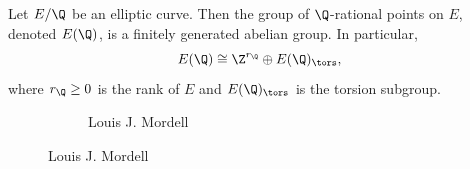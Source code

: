 

{
\begin{frame}
\titlepage
\end{frame}
}



\begin{frame}
	\begin{thm}[Mordell, 1922]
	Let $E/\Q$ be an elliptic curve. Then the group of $\Q$-rational points on $E$, denoted $E(\Q)$, is a finitely generated abelian group. In particular,
		\[
		E(\Q) \cong \Z^{r_\Q} \oplus E(\Q)_\tors,
		\]
	where $r_\Q \geq 0$ is the rank of $E$ and $E(\Q)_\tors$ is the torsion subgroup.
	\end{thm}
	\begin{figure}[h]
	\centering
	\begin{subfigure}{0.3\textwidth}
	\captionsetup{labelformat=empty}
	\centering
	\caption{Louis J. Mordell}
	\end{subfigure}
\end{figure}
\end{frame}
